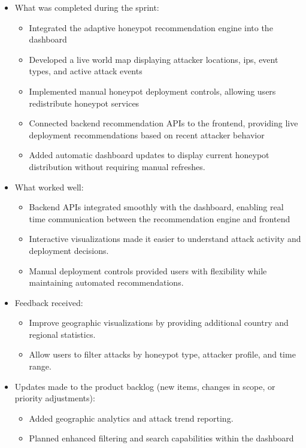 \documentclass{article}
\begin{document}
\begin{itemize}
    \item What was completed during the sprint:
    \begin{itemize}
        \item Integrated the adaptive honeypot recommendation engine into the dashboard
        \item Developed a live world map displaying attacker locations, ips, event types, and active attack events 
        \item Implemented manual honeypot deployment controls, allowing users redistribute honeypot services
        \item Connected backend recommendation APIs to the frontend, providing live deployment recommendations based on recent attacker behavior
        \item Added automatic dashboard updates to display current honeypot distribution without requiring manual refreshes.
    \end{itemize}
    \item What worked well:
    \begin{itemize}
        \item Backend APIs integrated smoothly with the dashboard, enabling real time communication between the recommendation engine and frontend
        \item Interactive visualizations made it easier to understand attack activity and deployment decisions.
        \item Manual deployment controls provided users with flexibility while maintaining automated recommendations.
    \end{itemize}
    
    \item Feedback received:
    \begin{itemize}
        \item Improve geographic visualizations by providing additional country and regional statistics.
        \item Allow users to filter attacks by honeypot type, attacker profile, and time range.
    \end{itemize}
    
    \item Updates made to the product backlog (new items, changes in scope, or priority adjustments):
     \begin{itemize}
        \item Added geographic analytics and attack trend reporting.
        \item Planned enhanced filtering and search capabilities within the dashboard
    \end{itemize}
\end{itemize}
\end{document}
